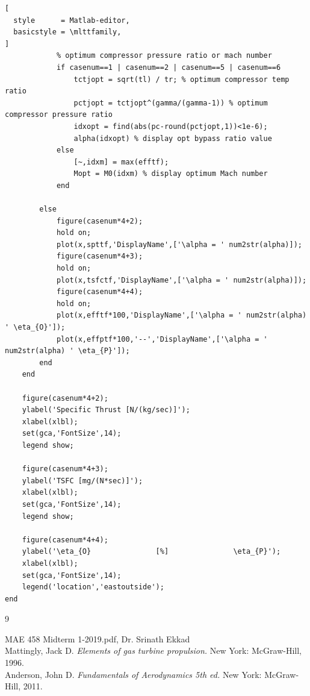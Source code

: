 \documentclass[]{aiaa-tc}%
\begin{document}
\begin{lstlisting}[
  style      = Matlab-editor,
  basicstyle = \mlttfamily,
]
			% optimum compressor pressure ratio or mach number
			if casenum==1 | casenum==2 | casenum==5 | casenum==6
				tctjopt = sqrt(tl) / tr; % optimum compressor temp ratio
				pctjopt = tctjopt^(gamma/(gamma-1)) % optimum compressor pressure ratio
				idxopt = find(abs(pc-round(pctjopt,1))<1e-6);
				alpha(idxopt) % display opt bypass ratio value
			else
				[~,idxm] = max(efftf);
				Mopt = M0(idxm) % display optimum Mach number
			end

		else
			figure(casenum*4+2);
			hold on;
			plot(x,spttf,'DisplayName',['\alpha = ' num2str(alpha)]);
			figure(casenum*4+3);
			hold on;
			plot(x,tsfctf,'DisplayName',['\alpha = ' num2str(alpha)]);
			figure(casenum*4+4);
			hold on;
			plot(x,efftf*100,'DisplayName',['\alpha = ' num2str(alpha) ' \eta_{O}']);
			plot(x,effptf*100,'--','DisplayName',['\alpha = ' num2str(alpha) ' \eta_{P}']);
		end
	end

	figure(casenum*4+2);
	ylabel('Specific Thrust [N/(kg/sec)]');
	xlabel(xlbl);
	set(gca,'FontSize',14);
	legend show;

	figure(casenum*4+3);
	ylabel('TSFC [mg/(N*sec)]');
	xlabel(xlbl);
	set(gca,'FontSize',14);
	legend show;

	figure(casenum*4+4);
	ylabel('\eta_{O}               [%]               \eta_{P}');
	xlabel(xlbl);
	set(gca,'FontSize',14);
	legend('location','eastoutside');
end

\end{lstlisting}

\begin{thebibliography}{9}%

 MAE 458 Midterm 1-2019.pdf, Dr. Srinath Ekkad \\
Mattingly, Jack D. \textit{Elements of gas turbine propulsion.} New York: McGraw-Hill, 1996.\\
Anderson, John D. \textit{Fundamentals of Aerodynamics 5th ed.} New York: McGraw-Hill, 2011.\\

\end{thebibliography}
\end{document}
